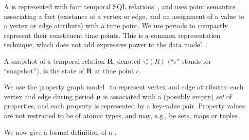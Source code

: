 A \tg is represented with four temporal SQL
relations~\cite{DBLP:conf/vldb/BohlenSS96}, and uses point
semantics~\cite{DBLP:reference/db/Toman09}, associating a fact
(existance of a vertex or edge, and an assignment of a value to a
vertex or edge attribute) with a time point.  We use periods to
compactly represent their constituent time points.  This is a common
representation technique, which does not add expressive power to the
data model~\cite{DBLP:conf/ictl/Chomicki94}.

A snapshot of a temporal relation $\mathbf{R}$, denoted $\tau^s_c(R)$
(``s'' stands for ``snapshot''), is the state of $\mathbf{R}$ at time
point $c$.

We use the property graph model~\cite{GraphDB} to represent vertex and
edge attributes: each vertex and edge during period $\boldsymbol{p}$ is
associated with a (possibly empty) {\em set} of properties, and each
property is represented by a key-value pair.  Property values are not
restricted to be of atomic types, and may, e.g., be sets, maps or
tuples.

We now give a formal definition of a \tg.


